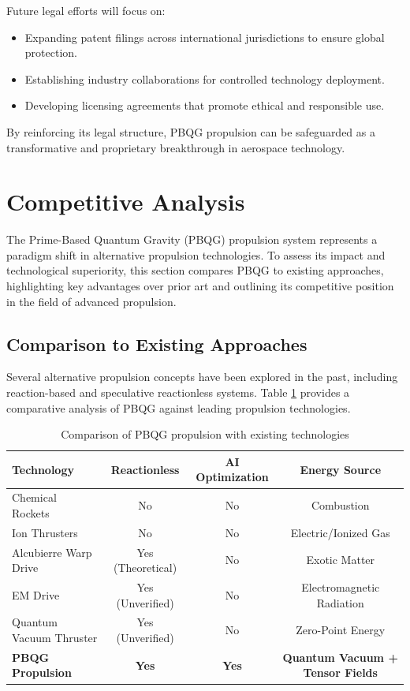 \documentclass{article}
\theoremstyle{plain}
\begin{document}
Future legal efforts will focus on:
\begin{itemize}
    \item Expanding patent filings across international jurisdictions to ensure global protection.
    \item Establishing industry collaborations for controlled technology deployment.
    \item Developing licensing agreements that promote ethical and responsible use.
\end{itemize}

By reinforcing its legal structure, PBQG propulsion can be safeguarded as a transformative and proprietary breakthrough in aerospace technology.

\section{Competitive Analysis}
\label{sec:competitive_analysis}

The Prime-Based Quantum Gravity (PBQG) propulsion system represents a paradigm shift in alternative propulsion technologies. To assess its impact and technological superiority, this section compares PBQG to existing approaches, highlighting key advantages over prior art and outlining its competitive position in the field of advanced propulsion.

\subsection{Comparison to Existing Approaches}
\label{subsec:comparison}

Several alternative propulsion concepts have been explored in the past, including reaction-based and speculative reactionless systems. Table \ref{tab:comparison} provides a comparative analysis of PBQG against leading propulsion technologies.

\begin{table}[h]
    \centering
    \begin{tabular}{|l|c|c|c|}
        \hline
        \textbf{Technology} & \textbf{Reactionless} & \textbf{AI Optimization} & \textbf{Energy Source} \\
        \hline
        Chemical Rockets & No & No & Combustion \\
        Ion Thrusters & No & No & Electric/Ionized Gas \\
        Alcubierre Warp Drive & Yes (Theoretical) & No & Exotic Matter \\
        EM Drive & Yes (Unverified) & No & Electromagnetic Radiation \\
        Quantum Vacuum Thruster & Yes (Unverified) & No & Zero-Point Energy \\
        \textbf{PBQG Propulsion} & \textbf{Yes} & \textbf{Yes} & \textbf{Quantum Vacuum + Tensor Fields} \\
        \hline
    \end{tabular}
    \caption{Comparison of PBQG propulsion with existing technologies}
    \label{tab:comparison}
\end{table}
\end{document}
